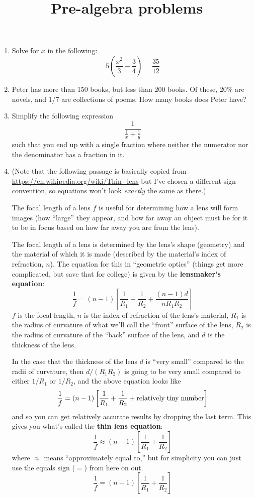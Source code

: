 \documentclass[10pt,letterpaper,twoside]{article}
\title{Pre-algebra problems}
\begin{document}
 
\twocolumn
\maketitle
\begin{enumerate}
    \item Solve for $x$ in the following: $$ 5\left(\frac{x^2}{3} - \frac{3}{4} \right) = \frac{35}{12} $$
    \item Peter has more than 150 books, but less than 200 books. Of these, 20\% are novels, and 1/7 are collections of poems. How many books does Peter have?
    \item Simplify the following expression
            $$\frac{1}{\frac{1}{x} + \frac{1}{y}}$$
        such that you end up with a single fraction where neither the numerator nor the
        denominator has a fraction in it.
    \item (Note that the following passage is basically copied from
        \url{https://en.wikipedia.org/wiki/Thin\_lens} but I've chosen a different sign
        convention, so equations won't look {\it exactly} the same as there.)

        The focal length of a lens $f$ is useful for determining how a lens will
        form images (how ``large'' they appear, and how far away an object must be for
        it to be in focus based on how far away you are from the lens).

        The focal length of a lens is determined by the lens's shape (geometry) and the
        material of which it is made (described by the material's index of refraction,
        $n$). The equation for this in ``geometric optics'' (things get more
        complicated, but save that for college) is given by the {\bf lensmaker's
        equation}:
            $$\frac{1}{f} = (n - 1)\left[ \frac{1}{R_1} + \frac{1}{R_2} + \frac{(n - 1)d}{nR_1R_2} \right]$$
        $f$ is the focal length, $n$ is the index of refraction of the lens's material, $R_1$ is the radius
        of curvature of what we'll call the ``front'' surface of the lens, $R_2$ is the radius of curvature of the
        ``back'' surface of the lens, and $d$ is the thickness of the lens.

        In the case that the thickness of the lens $d$ is ``very small'' compared to
        the radii of curvature, then $d/(R_1R_2)$ is going to be very small compared to
        either $1/R_1$ or $1/R_2$, and the
        above equation looks like
            $$\frac{1}{f} = (n - 1)\left[ \frac{1}{R_1} + \frac{1}{R_2} + {\rm relatively\;tiny\;number} \right]$$
        and so you can get relatively accurate results by dropping the last term.
        This gives you what's called the {\bf thin lens equation}:
            $$\frac{1}{f} \approx (n - 1)\left[ \frac{1}{R_1} + \frac{1}{R_2} \right]$$
        where $\approx$ means ``approximately equal to,'' but for simplicity you can just
        use the equals sign ($=$) from here on out.
            $$\frac{1}{f} = (n - 1)\left[ \frac{1}{R_1} + \frac{1}{R_2} \right]$$


\end{enumerate}
\end{document}
